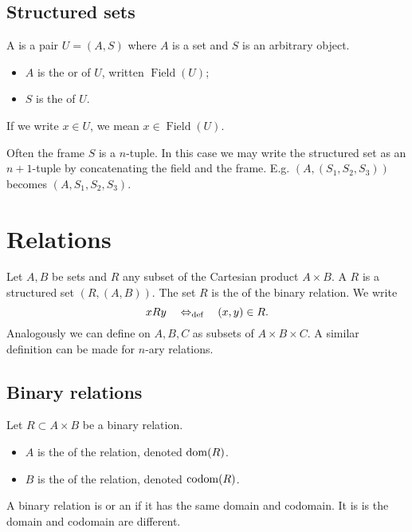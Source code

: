 \subsection{Structured sets}
\begin{definition}
A  is a pair $U = (A,S)$ where $A$ is a set and $S$ is an arbitrary object.
\begin{itemize}
\item $A$ is the  or  of $U$, written $\operatorname{Field}(U)$;
\item $S$ is the  of $U$.
\end{itemize}
If we write $x\in U$, we mean $x\in \operatorname{Field}(U)$.
\end{definition}

Often the frame $S$ is a $n$-tuple. In this case we may write the structured set as an $n+1$-tuple by concatenating the field and the frame. E.g. $(A,(S_1,S_2,S_3))$ becomes $(A,S_1,S_2,S_3)$.

\section{Relations}
\begin{definition}
Let $A,B$ be sets and $R$ any subset of the Cartesian product $A\times B$. A  $R$ is a structured set $(R,(A,B))$. The set $R$ is the  of the binary relation.
We write
\[ xRy \quad\Leftrightarrow_{\text{def}}\quad  (x,y)\in R. \]
Analogously we can define  on $A,B,C$ as subsets of $A\times B\times C$. A similar definition can be made for $n$-ary relations.
\end{definition}

\subsection{Binary relations}
\begin{definition}
Let $R\subset A\times B$ be a binary relation.
\begin{itemize}
\item $A$ is the  of the relation, denoted $\operatorname{dom}(R)$.
\item $B$ is the  of the relation, denoted $\operatorname{codom}(R)$.
\end{itemize}
A binary relation is  or an  if it has the same domain and codomain. It is  is the domain and codomain are different.
\end{definition}

